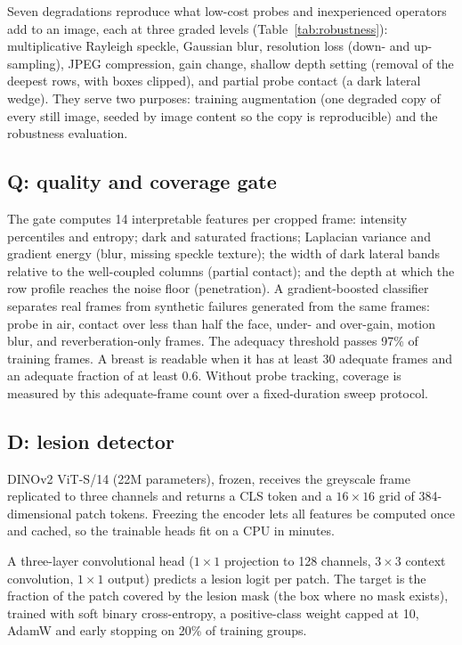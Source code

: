  Seven degradations reproduce what low-cost probes and inexperienced operators add to an image, each at three graded levels (Table~\ref{tab:robustness}): multiplicative Rayleigh speckle, Gaussian blur, resolution loss (down- and up-sampling), JPEG compression, gain change, shallow depth setting (removal of the deepest rows, with boxes clipped), and partial probe contact (a dark lateral wedge). They serve two purposes: training augmentation (one degraded copy of every still image, seeded by image content so the copy is reproducible) and the robustness evaluation.

\subsection{Q: quality and coverage gate}
The gate computes 14 interpretable features per cropped frame: intensity percentiles and entropy; dark and saturated fractions; Laplacian variance and gradient energy (blur, missing speckle texture); the width of dark lateral bands relative to the well-coupled columns (partial contact); and the depth at which the row profile reaches the noise floor (penetration). A gradient-boosted classifier separates real frames from synthetic failures generated from the same frames: probe in air, contact over less than half the face, under- and over-gain, motion blur, and reverberation-only frames. The adequacy threshold passes 97\% of training frames. A breast is readable when it has at least 30 adequate frames and an adequate fraction of at least 0.6. Without probe tracking, coverage is measured by this adequate-frame count over a fixed-duration sweep protocol.

\subsection{D: lesion detector}
 DINOv2 ViT-S/14 \cite{dinov2} (22M parameters), frozen, receives the greyscale frame replicated to three channels and returns a CLS token and a $16\times16$ grid of 384-dimensional patch tokens. Freezing the encoder lets all features be computed once and cached, so the trainable heads fit on a CPU in minutes.

 A three-layer convolutional head ($1\times1$ projection to 128 channels, $3\times3$ context convolution, $1\times1$ output) predicts a lesion logit per patch. The target is the fraction of the patch covered by the lesion mask (the box where no mask exists), trained with soft binary cross-entropy, a positive-class weight capped at 10, AdamW and early stopping on 20\% of training groups.

